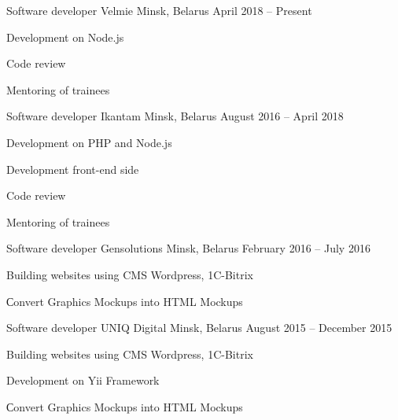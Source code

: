 

\begin{cventries}

  \cventry
    {Software developer} %
    {Velmie} %
    {Minsk, Belarus} %
    {April 2018 – Present} %
    {
      \begin{cvitems} %
		\item {Development on Node.js}
		\item {Code review}
		\item {Mentoring of trainees}
      \end{cvitems}
    }

  \cventry
    {Software developer} %
    {Ikantam} %
    {Minsk, Belarus} %
    {August 2016 – April 2018} %
    {
      \begin{cvitems} %
		\item {Development on PHP and Node.js}
		\item {Development front-end side}
		\item {Code review}
		\item {Mentoring of trainees}
      \end{cvitems}
    }

  \cventry
    {Software developer} %
    {Gensolutions} %
    {Minsk, Belarus} %
    {February 2016 – July 2016} %
    {
      \begin{cvitems} %
        \item {Building websites using CMS Wordpress, 1C-Bitrix}
		\item {Сonvert Graphics Mockups into HTML Mockups}
      \end{cvitems}
    }

  \cventry
    {Software developer} %
    {UNIQ Digital} %
    {Minsk, Belarus} %
    {August 2015 – December 2015} %
    {
      \begin{cvitems} %
        \item {Building websites using CMS Wordpress, 1C-Bitrix}
		\item {Development on Yii Framework}
		\item {Сonvert Graphics Mockups into HTML Mockups}
      \end{cvitems}
    }
	
\end{cventries}
